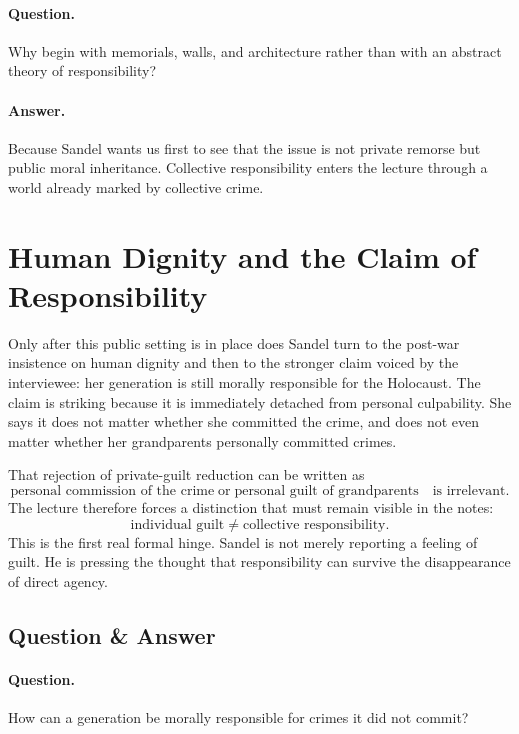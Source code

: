 \paragraph{Question.} Why begin with memorials, walls, and architecture rather than with an abstract theory of responsibility?

\paragraph{Answer.} Because Sandel wants us first to see that the issue is not private remorse but public moral inheritance. Collective responsibility enters the lecture through a world already marked by collective crime.

\section{Human Dignity and the Claim of Responsibility}

Only after this public setting is in place does Sandel turn to the post-war insistence on human dignity and then to the stronger claim voiced by the interviewee: her generation is still morally responsible for the Holocaust. The claim is striking because it is immediately detached from personal culpability. She says it does not matter whether she committed the crime, and does not even matter whether her grandparents personally committed crimes.

That rejection of private-guilt reduction can be written as
\begin{equation}
\text{personal commission of the crime}
\;\text{or}\;
\text{personal guilt of grandparents}
\quad \text{is irrelevant}.
\end{equation}
The lecture therefore forces a distinction that must remain visible in the notes:
\begin{equation}
\text{individual guilt}
\neq
\text{collective responsibility}.
\end{equation}
This is the first real formal hinge. Sandel is not merely reporting a feeling of guilt. He is pressing the thought that responsibility can survive the disappearance of direct agency.

\subsection{Question \& Answer}

\paragraph{Question.} How can a generation be morally responsible for crimes it did not commit?

